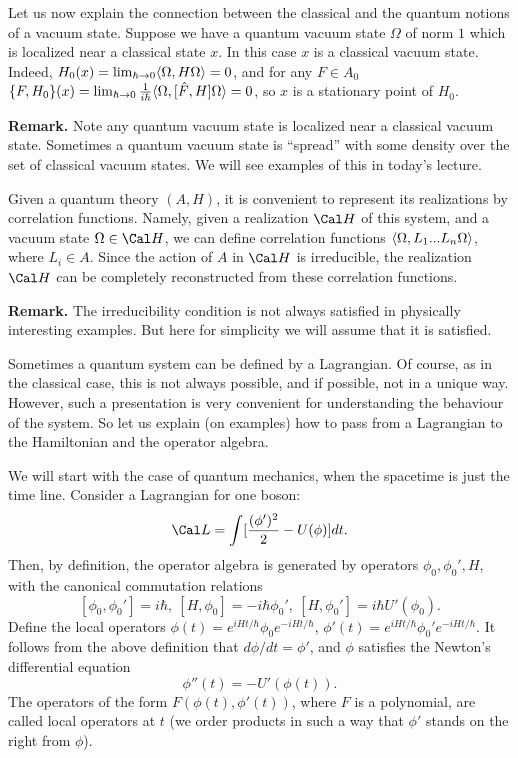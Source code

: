 Let us now explain the connection between the classical and the quantum 
notions of a vacuum state. Suppose we have a quantum vacuum state
$\Omega$ of norm $1$ which is localized near a classical state $x$. 
In this case $x$ is a classical vacuum state. 
Indeed, $H_0(x)=\lim_{\hbar\to 0}\langle\Omega,H\Omega\rangle=0$, and
for any $F\in A_0$ $\{F,H_0\}(x)=\lim_{\hbar\to 0}\frac{1}{i\hbar}
\langle\Omega,[\hat F,H]\Omega\rangle=0$, so $x$ is a stationary point of $H_0$. 

{\bf Remark.} Note any quantum vacuum state is localized near a classical 
vacuum state. Sometimes a quantum vacuum state is ``spread'' with some density over 
the set of classical vacuum states. We will see examples of this in today's lecture. 

Given a quantum theory $(A,H)$, it is convenient to represent its
realizations by correlation functions. Namely, given a realization
$\Cal H$ of this system, and a vacuum state $\Omega\in \Cal H$, 
we can define correlation functions $\langle\Omega, L_1...L_n\Omega\rangle$, 
where $L_i\in A$. Since the action of $A$ in $\Cal H$ is irreducible, 
the realization $\Cal H$ can be completely reconstructed from these 
correlation functions. 

{\bf Remark.} The irreducibility condition is not always satisfied in 
physically interesting examples. But here for simplicity we will assume
that it is satisfied. 

Sometimes a quantum system can be defined by a Lagrangian. 
Of course, as in the classical case, this is not always possible, and if 
possible, not in a unique way. However, 
such a presentation is very convenient for understanding the behaviour of the 
system. So let us explain (on examples) how to pass from a 
Lagrangian to the Hamiltonian  and the operator algebra. 

We will start with the case of quantum mechanics, when the spacetime is 
just the time line. Consider a Lagrangian for one boson:
$$
\Cal L=\int[\frac{(\phi')^2}{2}-U(\phi)]dt.
$$
Then, by definition, the operator algebra is generated by 
operators $\phi_0,\phi_0',H$, with the canonical commutation relations 
$$
[\phi_0,\phi_0']=i\hbar,\ [H,\phi_0]=-i\hbar \phi_0',\ [H,\phi_0']=
i\hbar U'(\phi_0).
$$
Define the local operators $\phi(t)=e^{iHt/\hbar}\phi_0
e^{-iHt/\hbar}$, $\phi'(t)=e^{iHt/\hbar}\phi_0'
e^{-iHt/\hbar}$.
It follows from the above definition 
that $d\phi/dt=\phi'$, and $\phi$ satisfies the
Newton's differential equation
$$
\phi''(t)=-U'(\phi(t)).
$$
The operators of the form $F(\phi(t),\phi'(t))$, where $F$ is a 
polynomial, are called local operators at $t$
(we order products in such a way that 
$\phi'$ stands on the right from $\phi$).

